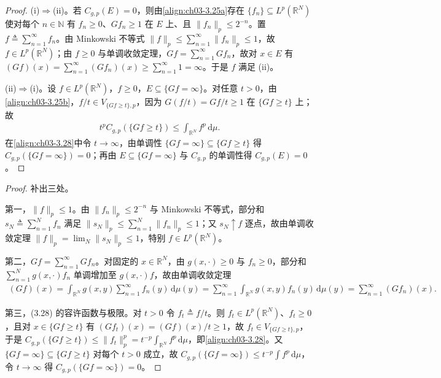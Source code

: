 \documentclass[../../main.tex]{subfiles}%
\begin{document}
\begin{proof}
(i)$\Rightarrow$(ii)。若 $C_{g,p}(E)=0$，则由\eqref{align:ch03-3.25a}存在 $\{f_n\}\subseteq L^p(\mathbb{R}^N)$ 使对每个 $n\in\mathbb{N}$ 有 $f_n\geqslant0$、$Gf_n\geqslant1$ 在 $E$ 上、且 $\|f_n\|_p\leqslant2^{-n}$。置 $f\triangleq\sum_{n=1}^\infty f_n$。由 Minkowski 不等式 $\|f\|_p\leqslant\sum_{n=1}^\infty\|f_n\|_p\leqslant1$，故 $f\in L^p(\mathbb{R}^N)$；由 $f\geqslant0$ 与单调收敛定理，$Gf=\sum_{n=1}^\infty Gf_n$，故对 $x\in E$ 有 $(Gf)(x)=\sum_{n=1}^\infty(Gf_n)(x)\geqslant\sum_{n=1}^\infty1=\infty$。于是 $f$ 满足 (ii)。

(ii)$\Rightarrow$(i)。设 $f\in L^p(\mathbb{R}^N)$，$f\geqslant0$，$E\subseteq\{Gf=\infty\}$。对任意 $t>0$，由\eqref{align:ch03-3.25b}，$f/t\in V_{\{Gf\geqslant t\},p}$，因为 $G(f/t)=Gf/t\geqslant1$ 在 $\{Gf\geqslant t\}$ 上；故
\begin{align}
t^pC_{g,p}(\{Gf\geqslant t\})\leqslant\int_{\mathbb{R}^N}f^p\,\mathrm{d}\mu.\label{align:ch03-3.28}
\end{align}
在\eqref{align:ch03-3.28}中令 $t\to\infty$，由单调性 $\{Gf=\infty\}\subseteq\{Gf\geqslant t\}$ 得 $C_{g,p}(\{Gf=\infty\})=0$；再由 $E\subseteq\{Gf=\infty\}$ 与 $C_{g,p}$ 的单调性得 $C_{g,p}(E)=0$。
\end{proof}

\begin{proof}
补出三处。

第一，$\|f\|_p\leqslant1$。由 $\|f_n\|_p\leqslant2^{-n}$ 与 Minkowski 不等式，部分和 $s_N\triangleq\sum_{n=1}^Nf_n$ 满足 $\|s_N\|_p\leqslant\sum_{n=1}^N\|f_n\|_p\leqslant1$；又 $s_N\uparrow f$ 逐点，故由单调收敛定理 $\|f\|_p=\lim_N\|s_N\|_p\leqslant1$，特别 $f\in L^p(\mathbb{R}^N)$。

第二，$Gf=\sum_{n=1}^\infty Gf_n$。对固定的 $x\in\mathbb{R}^N$，由 $g(x,\cdot)\geqslant0$ 与 $f_n\geqslant0$，部分和 $\sum_{n=1}^Ng(x,\cdot)f_n$ 单调增加至 $g(x,\cdot)f$，故由单调收敛定理
\begin{align*}
(Gf)(x)=\int_{\mathbb{R}^N}g(x,y)\sum_{n=1}^\infty f_n(y)\,\mathrm{d}\mu(y)=\sum_{n=1}^\infty\int_{\mathbb{R}^N}g(x,y)f_n(y)\,\mathrm{d}\mu(y)=\sum_{n=1}^\infty(Gf_n)(x).
\end{align*}

第三，(3.28) 的容许函数与极限。对 $t>0$ 令 $f_t\triangleq f/t$。则 $f_t\in L^p(\mathbb{R}^N)$、$f_t\geqslant0$，且对 $x\in\{Gf\geqslant t\}$ 有 $(Gf_t)(x)=(Gf)(x)/t\geqslant1$，故 $f_t\in V_{\{Gf\geqslant t\},p}$，于是 $C_{g,p}(\{Gf\geqslant t\})\leqslant\|f_t\|_p^p=t^{-p}\int_{\mathbb{R}^N}f^p\,\mathrm{d}\mu$，即\eqref{align:ch03-3.28}。又 $\{Gf=\infty\}\subseteq\{Gf\geqslant t\}$ 对每个 $t>0$ 成立，故 $C_{g,p}(\{Gf=\infty\})\leqslant t^{-p}\int f^p\,\mathrm{d}\mu$，令 $t\to\infty$ 得 $C_{g,p}(\{Gf=\infty\})=0$。
\end{proof}
\end{document}
